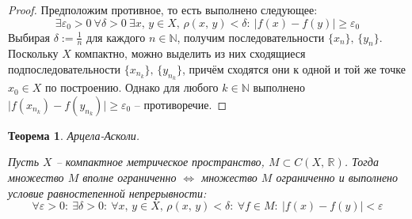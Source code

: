 \documentclass[a4paper,12pt]{article}
\renewcommand{\geq}{\ensuremath{\geqslant}}
\theoremstyle{plain}
\newtheorem{theorem}{Теорема}[section]
\theoremstyle{definition}
\theoremstyle{remark}
\begin{document}
\begin{proof}
	Предположим противное, то есть выполнено следующее:
	\[
		\exists \varepsilon_0 > 0 \: \forall \delta > 0 \: \exists x,\,y \in X,\, \rho(x,\, y) < \delta :\: \vert f(x) - f(y)\vert \geq \varepsilon_0
	\]
	Выбирая $\delta := \frac{1}{n}$ для каждого $n \in \mathbb{N}$, получим последовательности $\{x_n\},\, \{y_n\}$. Поскольку $X$ компактно, можно выделить из них сходящиеся подпоследовательности $\{x_{n_k}\},\, \{y_{n_k}\}$, причём сходятся они к одной и той же точке $x_0 \in X$ по построению. Однако для любого $k \in \mathbb{N}$ выполнено $\vert f(x_{n_k}) - f(y_{n_k})\vert \geq \varepsilon_0$ -- противоречие.
\end{proof}

\begin{theorem}
	Арцела-Асколи.

	Пусть $X$ -- компактное метрическое пространство, $M \subset C(X,\, \mathbb{R})$. Тогда множество $M$ вполне ограниченно $\Leftrightarrow$ множество $M$ ограниченно и выполнено условие равностепенной непрерывности:
	\[
		\forall \varepsilon > 0 :\: \exists \delta > 0 :\: \forall x,\, y \in X,\, \rho(x,\, y) < \delta :\: \forall f \in M :\: \vert f(x) - f(y)\vert < \varepsilon
	\]
\end{theorem}
\end{document}

